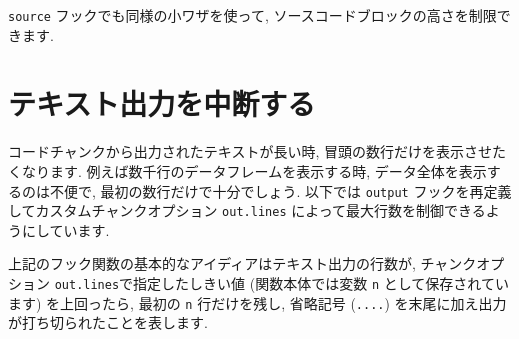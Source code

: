 \documentclass[
  11pt,
  lualatex,
  ja=standard]{bxjsreport}
\newenvironment{Shaded}{\begin{snugshade}}{\end{snugshade}}
\newcommand{\AttributeTok}[1]{\textcolor[rgb]{0.77,0.63,0.00}{#1}}
\newcommand{\CommentTok}[1]{\textcolor[rgb]{0.56,0.35,0.01}{\textit{#1}}}
\newcommand{\ControlFlowTok}[1]{\textcolor[rgb]{0.13,0.29,0.53}{\textbf{#1}}}
\newcommand{\FunctionTok}[1]{\textcolor[rgb]{0.00,0.00,0.00}{#1}}
\newcommand{\NormalTok}[1]{#1}
\newcommand{\OtherTok}[1]{\textcolor[rgb]{0.56,0.35,0.01}{#1}}
\newcommand{\SpecialCharTok}[1]{\textcolor[rgb]{0.00,0.00,0.00}{#1}}
\newcommand{\StringTok}[1]{\textcolor[rgb]{0.31,0.60,0.02}{#1}}
\begin{document}
\texttt{source} フックでも同様の小ワザを使って, ソースコードブロックの高さを制限できます.

\hypertarget{hook-truncate}{%
\section{テキスト出力を中断する}\label{hook-truncate}}

コードチャンクから出力されたテキストが長い時, 冒頭の数行だけを表示させたくなります. 例えば数千行のデータフレームを表示する時, データ全体を表示するのは不便で, 最初の数行だけで十分でしょう. 以下では \texttt{output} フックを再定義してカスタムチャンクオプション \texttt{out.lines} によって最大行数を制御できるようにしています.

\begin{Shaded}
\end{Shaded}

上記のフック関数の基本的なアイディアはテキスト出力の行数が, チャンクオプション \texttt{out.lines}で指定したしきい値 (関数本体では変数 \texttt{n} として保存されています) を上回ったら, 最初の \texttt{n} 行だけを残し, 省略記号 (\texttt{....}) を末尾に加え出力が打ち切られたことを表します.
\end{document}
